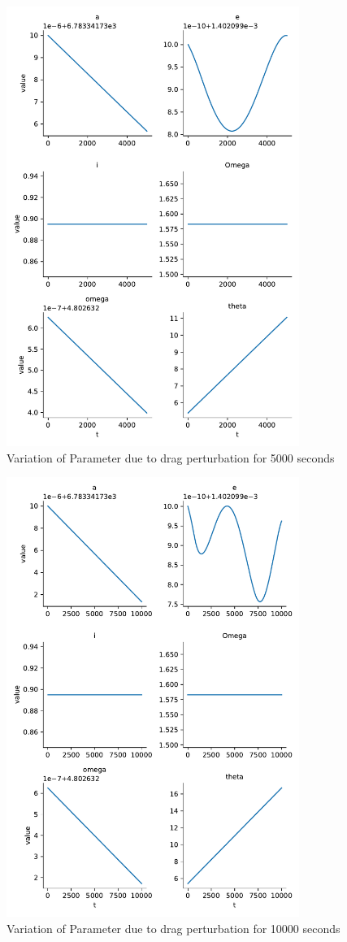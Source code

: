 \begin{figure}[H]
    \centering
    \includegraphics[width=0.85\textwidth]{../Figure/Q2/orbital_elements_drag_5000.pdf}
    \caption{Variation of Parameter due to drag perturbation for 5000 seconds}
\end{figure}

\begin{figure}[H]
    \centering
    \includegraphics[width=0.85\textwidth]{../Figure/Q2/orbital_elements_drag_10000.pdf}
    \caption{Variation of Parameter due to drag perturbation for 10000 seconds}
\end{figure}